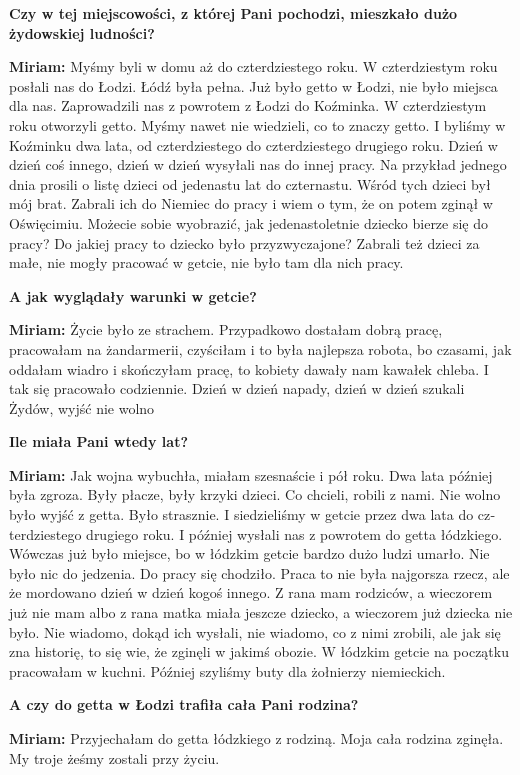 \begin{otherlanguage}{ngerman}
\textbf{Czy w tej miejscowości, z której Pani pochodzi, mieszkało dużo żydowskiej ludności?} 

\textbf{Miriam:} Myśmy byli w domu aż do czterdziestego roku. W czterdziestym roku posłali nas do Łodzi. Łódź była pełna. Już było getto w Łodzi, nie było miejsca dla nas. Zaprowadzili nas z powrotem z Łodzi do Koźminka. W czterdziestym roku otworzyli getto. Myśmy nawet nie wiedzieli, co to znaczy getto. I byliśmy w Koźminku dwa lata, od czterdziestego do czterdziestego drugiego roku. Dzień w dzień coś innego, dzień w dzień wysyłali nas do innej pracy. Na przykład jednego dnia prosili o listę dzieci od jedenastu lat do czternastu. Wśród tych dzieci był mój brat. Zabrali ich do Niemiec do pracy i wiem o tym, że on potem zginął w Oświęcimiu. Możecie sobie wyobrazić, jak jedenastoletnie dziecko bierze się do pracy? Do jakiej pracy to dziecko było przyzwyczajone? Zabrali też dzieci za małe, nie mogły pracować w getcie, nie było tam dla nich pracy.  

\textbf{A jak wyglądały warunki w getcie?} 

\textbf{Miriam:}  Życie było ze strachem. Przypadkowo dostałam dobrą pracę, pracowałam na żandarmerii, czyściłam i to była najlepsza robota, bo czasami, jak oddałam wiadro i skończyłam pracę, to kobiety dawały nam kawałek chleba. I tak się pracowało codziennie. Dzień w dzień napady, dzień w dzień szukali Żydów, wyjść nie wolno 

\textbf{Ile miała Pani wtedy lat? } 

\textbf{Miriam:}  Jak wojna wybuchła, miałam szesnaście i pół roku. Dwa lata później była zgroza. Były płacze, były krzyki dzieci. Co chcieli, robili z nami. Nie wolno było wyjść z getta. Było strasznie. I siedzieliśmy w getcie przez dwa lata do czterdziestego drugiego roku. I później wysłali nas z powrotem do getta łódzkiego. Wówczas już było miejsce, bo w łódzkim getcie bardzo dużo ludzi umarło. Nie było nic do jedzenia. Do pracy się chodziło. Praca to nie była najgorsza rzecz, ale że mordowano dzień w dzień kogoś innego. Z rana mam rodziców, a wieczorem już nie mam albo z rana matka miała jeszcze dziecko, a wieczorem już dziecka nie było. Nie wiadomo, dokąd ich wysłali, nie wiadomo, co z nimi zrobili, ale jak się zna historię, to się wie, że zginęli w jakimś obozie. W łódzkim getcie na początku pracowałam w kuchni. Później szyliśmy buty dla żołnierzy niemieckich.

\textbf{A czy do getta w Łodzi trafiła cała Pani rodzina?} 

\textbf{Miriam:} Przyjechałam do getta łódzkiego z rodziną. Moja cała rodzina zginęła. My troje żeśmy zostali przy życiu.  


\end{otherlanguage}
